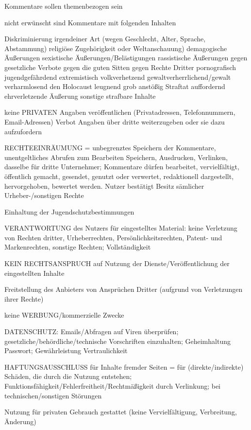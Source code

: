 Kommentare sollen themenbezogen sein

nicht erwünscht sind Kommentare mit folgenden Inhalten

Diskriminierung irgendeiner Art (wegen Geschlecht, Alter, Sprache, Abstammung) religiöse Zugehörigkeit oder Weltanschauung)
demagogische Äußerungen
sexistische Äußerungen/Belästigungen
rassistische Äußerungen 
gegen gesetzliche Verbote
gegen die guten Sitten 
gegen Rechte Dritter
pornografisch
jugendgefährdend
extremistisch
volkverhetzend
gewaltverherrlichend/gewalt verharmlosend
den Holocaust leugnend
grob anstößig
Straftat auffordernd 
ehrverletzende Äußerung
sonstige strafbare Inhalte



keine PRIVATEN Angaben veröffentlichen (Privatadressen, Telefonnummern, Email-Adressen)
Verbot Angaben über dritte weiterzugeben oder sie dazu aufzufordern

RECHTEEINRÄUMUNG =
unbegrenztes Speichern der Kommentare, unentgeltliches Abrufen zum Bearbeiten Speichern, Ausdrucken, Verlinken, dasselbe für dritte Unternehmer; Kommentare dürfen bearbeitet, vervielfältigt, öffentlich gemacht, gesendet, genutzt oder verwertet, redaktionell dargestellt, hervorgehoben, bewertet werden.
Nutzer bestätigt Besitz sämlicher Urheber-/sonstigen Rechte


Einhaltung der Jugendschutzbestimmungen

VERANTWORTUNG des Nutzers für eingestelltes Material: 
keine Verletzung von Rechten dritter, Urheberrechten, Persönlichkeitsrechten, Patent- und Markenrechten, sonstige Rechten; Vollständigkeit


KEIN RECHTSANSPRUCH auf Nutzung der Dienste/Veröffentlichung der eingestellten Inhalte

Freitstellung des Anbieters von Ansprüchen Dritter  (aufgrund von Verletzungen ihrer Rechte) 

keine WERBUNG/kommerzielle Zwecke

DATENSCHUTZ: Emails/Abfragen auf Viren überprüfen; gesetzliche/behördliche/technische Vorschriften einzuhalten; Geheimhaltung Passwort; Gewährleistung Vertraulichkeit

HAFTUNGSAUSSCHLUSS für Inhalte fremder Seiten = für (direkte/indirekte) Schäden, die durch die Nutzung entstehen; Funktionsfähigkeit/Fehlerfreitheit/Rechtmäßigkeit durch Verlinkung; bei technischen/sonstigen Störungen

Nutzung für privaten Gebrauch gestattet (keine Vervielfältigung, Verbreitung, Änderung)



